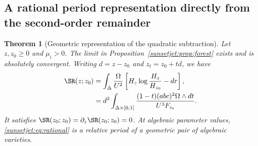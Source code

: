 \documentclass[11pt,a4paper,oneside]{article}
\theoremstyle{plain}
\newtheorem{theorem}{Theorem}[section]
\theoremstyle{definition}
\theoremstyle{remark}
\numberwithin{equation}{section}
\begin{document}
\subsection{A rational period representation directly from the second-order remainder}
\begin{theorem}[Geometric representation of the quadratic subtraction]\label{sunsetjet:thm:period}
Let $z,z_0\geq0$ and $\mu_i>0$. The limit in Proposition~\ref{sunsetjet:prop:forest} exists and is absolutely convergent.
Writing $d=z-z_0$ and $z_t=z_0+td$, we have
\begin{align}
 \SR(z;z_0)
 &=\int_\Delta\frac{\Omega}{U^2}
       \left[H_z\log\frac{H_z}{H_{z_0}}-d r\right],\label{sunsetjet:eq:log}\\
 &=d^2\int_{\Delta\times[0,1]}
       \frac{(1-t)(abc)^2\Omega\wedge dt}{U^3F_{z_t}}.\label{sunsetjet:eq:rational}
\end{align}
It satisfies $\SR(z_0;z_0)=\partial_z\SR(z_0;z_0)=0$.
At algebraic parameter values, \eqref{sunsetjet:eq:rational} is a relative period of a geometric pair of algebraic varieties.
\end{theorem}
\end{document}

